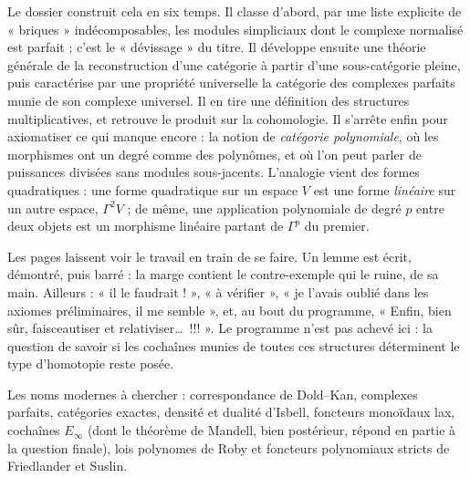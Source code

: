 \documentclass[11pt,a4paper]{article}
\begin{document}
\begin{resume}
Le dossier construit cela en six temps. Il classe d'abord, par une liste
explicite de « briques » indécomposables, les modules simpliciaux dont le
complexe normalisé est parfait ; c'est le « dévissage » du titre. Il
développe ensuite une théorie générale de la reconstruction d'une catégorie à
partir d'une sous-catégorie pleine, puis caractérise par une propriété
universelle la catégorie des complexes parfaits munie de son complexe
universel. Il en tire une définition des structures multiplicatives, et
retrouve le produit sur la cohomologie. Il s'arrête enfin pour axiomatiser ce
qui manque encore : la notion de \emph{catégorie polynomiale}, où les
morphismes ont un degré comme des polynômes, et où l'on peut parler de
puissances divisées sans modules sous-jacents. L'analogie vient des formes quadratiques : une
forme quadratique sur un espace $V$ est une forme
\emph{linéaire} sur un autre espace, $\Gamma^{2}V$ ; de même, une application
polynomiale de degré $p$ entre deux objets est un morphisme linéaire
partant de $\Gamma^{p}$ du premier.

Les pages laissent voir le travail en train de se faire. Un lemme est écrit,
démontré, puis barré : la marge contient le contre-exemple qui le ruine, de
sa main. Ailleurs : « il le faudrait ! », « à vérifier », « je l'avais oublié
dans les axiomes préliminaires, il me semble », et, au bout du programme,
« Enfin, bien sûr, faisceautiser et relativiser\ldots\ !!! ». Le programme
n'est pas achevé ici : la question de savoir si les cochaînes munies de
toutes ces structures déterminent le type d'homotopie reste posée.

Les noms modernes à chercher : correspondance de Dold–Kan, complexes
parfaits, catégories exactes, densité et dualité d'Isbell, foncteurs
monoïdaux lax, cochaînes $E_{\infty}$ (dont le théorème de Mandell, bien
postérieur, répond en partie à la question finale), lois polynomes de Roby
et foncteurs polynomiaux stricts de Friedlander et Suslin.

\end{resume}
\end{document}
